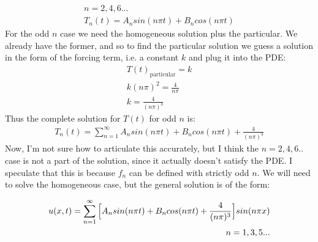 \documentclass{article}
\begin{document}
\begin{equation}
\begin{aligned}
n = 2,4,6...\\
T_n(t) = A_n sin(n\pi t) + B_n cos(n\pi t)
\end{aligned}
\end{equation}
For the odd $n$ case we need the homogeneous solution plus the particular. We already have the former, and so to find the particular solution we guess a solution in the form of the forcing term, i.e. a constant $k$ and plug it into the PDE:
\begin{equation}
\begin{aligned}
T(t)_{\text{particular}} = k\\
k(n\pi)^2= \frac{4}{n\pi}\\
k = \frac{4}{(n\pi)^3}
\end{aligned}
\end{equation}
Thus the complete solution for $T(t)$ for odd $n$ is:
\begin{equation}
\begin{aligned}
T_n(t) = \sum_{n=1}^{\infty}A_n sin(n\pi t) + B_n cos(n\pi t) + \frac{4}{(n\pi)^3}
\end{aligned}
\end{equation}
Now, I'm not sure how to articulate this accurately, but I think the $n=2,4,6..$ case is not a part of the solution, since it actually doesn't satisfy the PDE. I speculate that this is because $f_n$ can be defined with strictly odd $n$. We will need to solve the homogeneous case, but the general solution is of the form:
\begin{tcolorbox}[minipage,colback=white,arc=0pt,outer arc=0pt]
\begin{equation}
\begin{aligned}
u(x,t) = \sum_{n=1}^{\infty} \Big{[} A_n sin(n\pi t) + B_n cos(n\pi t) +\frac{4}{(n\pi)^3} \Big{]}sin(n\pi x)\\
n = 1,3,5...
\end{aligned}
\end{equation}
\end{tcolorbox}
\end{document}
